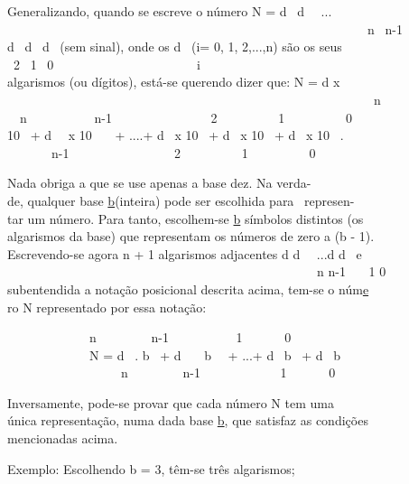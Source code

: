 \documentclass[a4paper,12pt]{article}
\begin{document}
Generalizando, quando se escreve o número N = d \ d \ \ ...\\[-1em]
\phantom \ \ \ \ \ \ \ \ \ \ \ \ \ \ \ \ \ \ \ \ \ \ \ \ \ \ \ \ \ \ \ \ \ \ \ \ \ \ \ \ \ \ \ \ \ \ \ \ \ \ \ \ \ \ \ \ \ n \ n-1\\[-0.5em]
d \ d \ d \ (sem sinal), onde os d \ (i= 0, 1, 2,...,n) são os seus\\[-1em]
\phantom \ 2 \ 1 \ 0 \ \ \ \ \ \ \ \ \ \ \ \ \ \ \ \ \ \ \ \ \ \ i\\[-0.5em]
algarismos (ou dígitos), está-se querendo dizer que: N = d \hfill x\\[-1em]
\phantom \ \ \ \ \ \ \ \ \ \ \ \ \ \ \ \ \ \ \ \ \ \ \ \ \ \ \ \ \ \ \ \ \ \ \ \ \ \ \ \ \ \ \ \ \ \ \ \ \ \ \ \ \ \ \ \ \ \ n \\[-1em]
\phantom \ \ n \ \ \ \ \ \ \ \ \ \ n-1 \ \ \ \ \ \ \ \ \ \ \ \ \ \ \ 2 \ \ \ \ \ \ \ \ \ 1 \ \ \ \ \ \ \ \ \ 0\\[-1em]
10 \ + d \ \ x 10 \ \ \ + ....+ d \ x 10 \ + d \ x 10 \ + d \ x 10 \ .\\[-1em]
\phantom \ \ \ \ \ \ \ n-1 \ \ \ \ \ \ \ \ \ \ \ \ \ \ \ \ 2 \ \ \ \ \ \ \ \ \ 1 \ \ \ \ \ \ \ \ \ 0\\
\par
Nada obriga a que se use apenas a base dez. Na verda-\\
de, qualquer base \uline b(inteira) pode ser escolhida para \ represen-\\
tar um número. Para tanto, escolhem-se \uline b símbolos distintos (os\\
algarismos da base) que representam os números de zero a (b - 1).\\
Escrevendo-se agora n + 1 algarismos adjacentes d d \ \ ...d d \ e\\[-1em]
\phantom \ \ \ \ \ \ \ \ \ \ \ \ \ \ \ \ \ \ \ \ \ \ \ \ \ \ \ \ \ \ \ \ \ \ \ \ \ \ \ \ \ \ \ \ \ \ \ \ \ n n-1 \ \ \ 1 0\\[-0.5em]
subentendida a notação posicional descrita acima, tem-se o núm\uline e\\
ro N representado por essa notação:\par
\ \ \ \ \ \ \ \ \ \ \ \ \ n \ \ \ \ \ \ \ \ n-1 \ \ \ \ \ \ \ \ \ \ 1 \ \ \ \ \ \ 0\\[-1em]
\phantom \ \ \ \ \ \ \ \ \ \ \ \ \ N = d \ . b \ + d \ \ \ b \ \ + ...+ d \ b \ + d \ b\\[-1em]
\phantom \ \ \ \ \ \ \ \ \ \ \ \ \ \ \ \ \ \ n \ \ \ \ \ \ \ \ n-1 \ \ \ \ \ \ \ \ \ \ \ \ 1 \ \ \ \ \ \ 0\\[-0.5em]
\par
Inversamente, pode-se provar que cada número N tem uma\\
única representação, numa dada base \uline b, que satisfaz as condições\\
mencionadas acima.\\
\par
Exemplo: Escolhendo b = 3, têm-se três algarismos;
\end{document}

